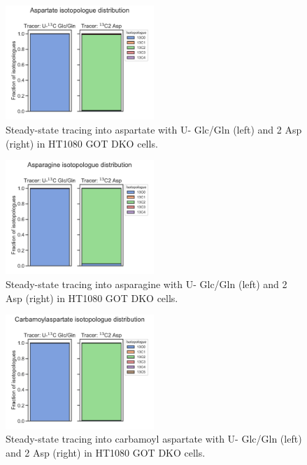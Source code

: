 \begin{figure}[ht]
    \centering
    \includegraphics[width=0.5\textwidth]{figures/sapp/DKO_char/HT1080_Asp_iso_dist.pdf}
    \caption[\hCi{} Gln/Glc, Asp tracing in HT1080 GOT DKO, Asp]{
    Steady-state tracing into aspartate with U-\hCi{} Glc/Gln (left) and \hCi{}2 Asp (right) in HT1080 GOT DKO cells.
    }
    \label{fig:sapp:DKO_char:HT1080_Asp_iso_dist}
\end{figure}

\begin{figure}[ht]
    \centering
    \includegraphics[width=0.5\textwidth]{figures/sapp/DKO_char/HT1080_Asn_iso_dist.pdf}
    \caption[\hCi{} Gln/Glc, Asp tracing in HT1080 GOT DKO, Asn]{
    Steady-state tracing into asparagine with U-\hCi{} Glc/Gln (left) and \hCi{}2 Asp (right) in HT1080 GOT DKO cells.
    }
    \label{fig:sapp:DKO_char:HT1080_Asn_iso_dist}
\end{figure}

\begin{figure}[ht]
    \centering
    \includegraphics[width=0.5\textwidth]{figures/sapp/DKO_char/HT1080_CarbAsp_iso_dist.pdf}
    \caption[\hCi{} Gln/Glc, Asp tracing in HT1080 GOT DKO, Carbamoyl Asp]{
    Steady-state tracing into carbamoyl aspartate with U-\hCi{} Glc/Gln (left) and \hCi{}2 Asp (right) in HT1080 GOT DKO cells.
    }
    \label{fig:sapp:DKO_char:HT1080_CarbAsp_iso_dist}
\end{figure}

